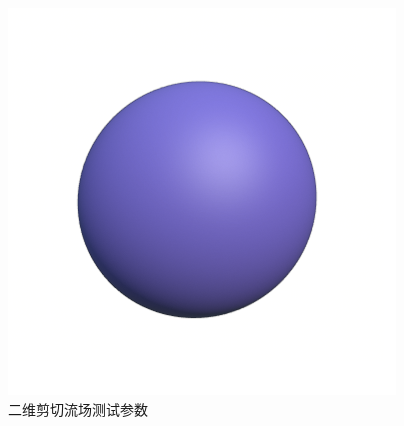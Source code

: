 \begin{figure}[htbp]
	\begin{minipage}[b]{0.65\linewidth}
		\renewcommand{\arraystretch}{1.2}
		\centering
		
	\end{minipage}
	\hfill
	\begin{minipage}{0.3\linewidth}
		\centering
		\includegraphics[width=1\linewidth]{images/3}
	\end{minipage}
	\caption{二维剪切流场测试参数}
	\label{tab:vortexSetup}
\end{figure}



